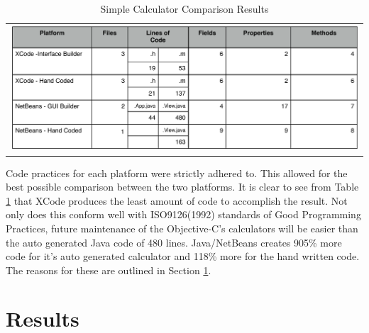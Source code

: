 \documentclass[a4paper,14pt]{article}
\begin{document}
\begin{table}[H]
\centering
\begin{tabular}{l}
\includegraphics[scale=0.6]{FileComparisons.pdf}
\end{tabular}
\caption{Simple Calculator Comparison Results}
\label{table:calccompare}
\end{table}
Code practices for each platform were strictly adhered to. This allowed for the best possible comparison between the two platforms. It is clear to see from Table \ref{table:calccompare} that XCode produces the least amount of code to accomplish the result. Not only does this conform well with ISO9126(1992) standards of Good Programming Practices, future maintenance of the Objective-C's calculators will be easier than the auto generated Java code of 480 lines. Java/NetBeans creates 905\% more code for it's auto generated calculator and 118\% more for the hand written code. The reasons for these are outlined in Section \ref{sec:results}.

\section{Results} %
\label{sec:results}
\end{document}
